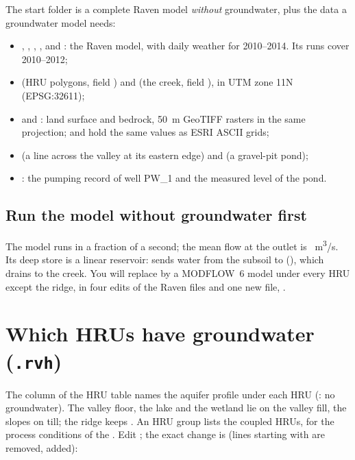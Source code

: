 The start folder is a complete Raven model \emph{without} groundwater, plus the data a groundwater model needs:
\begin{itemize}
\item {}, , , ,  and : the Raven model, with daily
      weather for 2010--2014. Its runs cover 2010--2012;
\item {} (HRU polygons, field ) and  (the creek, field ), in UTM
      zone 11N (EPSG:32611);
\item {} and : land surface and bedrock, 50~m GeoTIFF rasters in the same projection;
       and  hold the same values as ESRI ASCII grids;
\item {} (a line across the valley at its eastern edge) and  (a gravel-pit pond);
\item {}: the pumping record of well PW\_1 and the measured level of the pond.
\end{itemize}

\subsection{Run the model without groundwater first}
The model runs in a fraction of a second; the mean flow at the outlet is ~m\textsuperscript{3}/s. Its
deep store is a linear reservoir:  sends water from the subsoil to  (), which
drains to the creek.
You will replace  by a MODFLOW~6 model under every HRU except the ridge, in four edits of the Raven
files and one new file, .

\section{Which HRUs have groundwater (\texttt{.rvh})}
The  column of the HRU table names the aquifer profile under each HRU (\cmd{[NONE]}: no groundwater).
The valley floor, the lake and the wetland lie on the valley fill, the slopes on till; the ridge keeps \cmd{[NONE]}. An HRU
group  lists the coupled HRUs, for the process conditions of the . Edit ; the exact
change is (lines starting with \cmd{-} are removed, \cmd{+} added):

